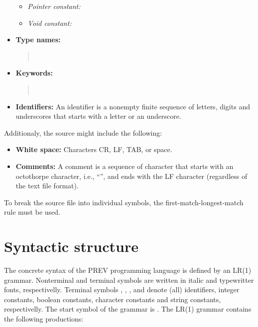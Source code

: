 \documentclass[10pt]{article}
\begin{document}
\begin{itemize}
\begin{itemize}
\item \textit{Pointer constant:} 
\item \textit{Void constant:} 
\end{itemize}
\item \textbf{Type names:}
\begin{quote}
\ \ \ \ \ \ \ \ 
\end{quote}
\item \textbf{Keywords:}
\begin{quote}
\ \ \ \ \ \ \ \ \ \ \ \ \ \ \ \ \ \ \ \ \ \ \ \ 
\end{quote}
\item \textbf{Identifiers:} An identifier is a nonempty finite sequence of letters, digits and underscores that starts with a letter or an underscore.
\end{itemize}
Additionaly, the source might include the following:
\begin{itemize}
\item \textbf{White space:} Characters CR, LF, TAB, or space.
\item \textbf{Comments:} A comment is a sequence of character that starts with an octothorpe character, i.e., ``\texttt{}'', and ends with the LF character (regardless of the text file format).
\end{itemize}

To break the source file into individual symbols, the first-match-longest-match rule must be used.

\section{Syntactic structure}

The concrete syntax of the PREV programming language is defined by an LR(1) grammar.  Nonterminal and terminal symbols are written in italic and typewritter fonts, respectivelly.  Terminal symbols , , ,  and  denote (all) identifiers, integer constants, bool\-ean constants, character constants and string constants, respectivelly.  The start symbol of the grammar is .  The LR(1) grammar contains the following productions:
\medskip\par

\begingroup
\parskip=0pt

\medskip\par
\endgroup
\end{document}
